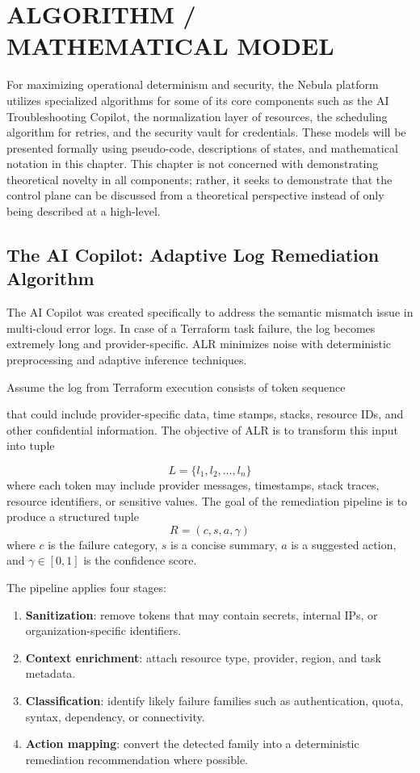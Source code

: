 \chapter{ALGORITHM / MATHEMATICAL MODEL}

For maximizing operational determinism and security, the Nebula platform utilizes specialized algorithms for some of its core components such as the AI Troubleshooting Copilot, the normalization layer of resources, the scheduling algorithm for retries, and the security vault for credentials. These models will be presented formally using pseudo-code, descriptions of states, and mathematical notation in this chapter. This chapter is not concerned with demonstrating theoretical novelty in all components; rather, it seeks to demonstrate that the control plane can be discussed from a theoretical perspective instead of only being described at a high-level.

\section{The AI Copilot: Adaptive Log Remediation Algorithm}
The AI Copilot was created specifically to address the semantic mismatch issue in multi-cloud error logs. In case of a Terraform task failure, the log becomes extremely long and provider-specific. ALR minimizes noise with deterministic preprocessing and adaptive inference techniques.
 
 
Assume the log from Terraform execution consists of token sequence


that could include provider-specific data, time stamps, stacks, resource IDs, and other confidential information. The objective of ALR is to transform this input into tuple

\[
L = \{l_1, l_2, \ldots, l_n\}
\]
where each token may include provider messages, timestamps, stack traces, resource identifiers, or sensitive values. The goal of the remediation pipeline is to produce a structured tuple
\[
R = (c, s, a, \gamma)
\]
where $c$ is the failure category, $s$ is a concise summary, $a$ is a suggested action, and $\gamma \in [0,1]$ is the confidence score.

The pipeline applies four stages:
\begin{enumerate}
    \item \textbf{Sanitization}: remove tokens that may contain secrets, internal IPs, or organization-specific identifiers.
    \item \textbf{Context enrichment}: attach resource type, provider, region, and task metadata.
    \item \textbf{Classification}: identify likely failure families such as authentication, quota, syntax, dependency, or connectivity.
    \item \textbf{Action mapping}: convert the detected family into a deterministic remediation recommendation where possible.
\end{enumerate}

